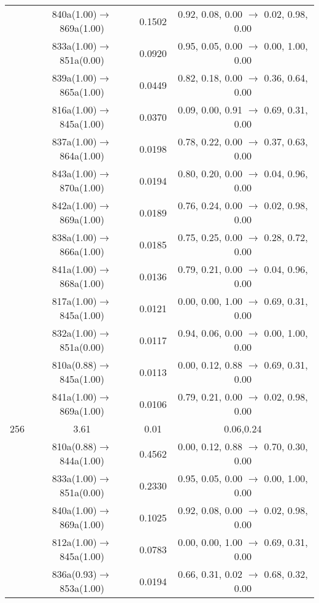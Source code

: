\documentclass[10pt,a4paper]{article}
\begin{document}
\begin{longtable}{c|c|c|c}
 	& 840a(1.00)$\rightarrow$869a(1.00) &	 0.1502 &	 0.92, 0.08, 0.00 $\rightarrow$ 0.02, 0.98, 0.00 \\ 
 	& 833a(1.00)$\rightarrow$851a(0.00) &	 0.0920 &	 0.95, 0.05, 0.00 $\rightarrow$ 0.00, 1.00, 0.00 \\ 
 	& 839a(1.00)$\rightarrow$865a(1.00) &	 0.0449 &	 0.82, 0.18, 0.00 $\rightarrow$ 0.36, 0.64, 0.00 \\ 
 	& 816a(1.00)$\rightarrow$845a(1.00) &	 0.0370 &	 0.09, 0.00, 0.91 $\rightarrow$ 0.69, 0.31, 0.00 \\ 
 	& 837a(1.00)$\rightarrow$864a(1.00) &	 0.0198 &	 0.78, 0.22, 0.00 $\rightarrow$ 0.37, 0.63, 0.00 \\ 
 	& 843a(1.00)$\rightarrow$870a(1.00) &	 0.0194 &	 0.80, 0.20, 0.00 $\rightarrow$ 0.04, 0.96, 0.00 \\ 
 	& 842a(1.00)$\rightarrow$869a(1.00) &	 0.0189 &	 0.76, 0.24, 0.00 $\rightarrow$ 0.02, 0.98, 0.00 \\ 
 	& 838a(1.00)$\rightarrow$866a(1.00) &	 0.0185 &	 0.75, 0.25, 0.00 $\rightarrow$ 0.28, 0.72, 0.00 \\ 
 	& 841a(1.00)$\rightarrow$868a(1.00) &	 0.0136 &	 0.79, 0.21, 0.00 $\rightarrow$ 0.04, 0.96, 0.00 \\ 
 	& 817a(1.00)$\rightarrow$845a(1.00) &	 0.0121 &	 0.00, 0.00, 1.00 $\rightarrow$ 0.69, 0.31, 0.00 \\ 
 	& 832a(1.00)$\rightarrow$851a(0.00) &	 0.0117 &	 0.94, 0.06, 0.00 $\rightarrow$ 0.00, 1.00, 0.00 \\ 
 	& 810a(0.88)$\rightarrow$845a(1.00) &	 0.0113 &	 0.00, 0.12, 0.88 $\rightarrow$ 0.69, 0.31, 0.00 \\ 
 	& 841a(1.00)$\rightarrow$869a(1.00) &	 0.0106 &	 0.79, 0.21, 0.00 $\rightarrow$ 0.02, 0.98, 0.00 \\ 
 \hline256 &	 3.61 &	 0.01 &	 0.06,0.24 \\ 
  	& 810a(0.88)$\rightarrow$844a(1.00) &	 0.4562 &	 0.00, 0.12, 0.88 $\rightarrow$ 0.70, 0.30, 0.00 \\ 
 	& 833a(1.00)$\rightarrow$851a(0.00) &	 0.2330 &	 0.95, 0.05, 0.00 $\rightarrow$ 0.00, 1.00, 0.00 \\ 
 	& 840a(1.00)$\rightarrow$869a(1.00) &	 0.1025 &	 0.92, 0.08, 0.00 $\rightarrow$ 0.02, 0.98, 0.00 \\ 
 	& 812a(1.00)$\rightarrow$845a(1.00) &	 0.0783 &	 0.00, 0.00, 1.00 $\rightarrow$ 0.69, 0.31, 0.00 \\ 
 	& 836a(0.93)$\rightarrow$853a(1.00) &	 0.0194 &	 0.66, 0.31, 0.02 $\rightarrow$ 0.68, 0.32, 0.00 \\ 

\end{longtable}
\end{document}
